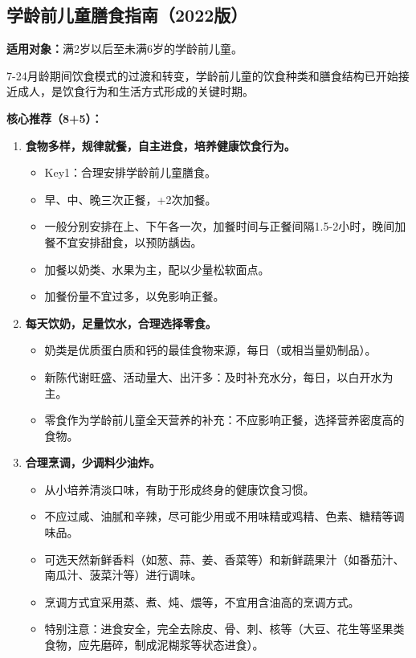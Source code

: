 \subsection{学龄前儿童膳食指南（2022版）}

\begin{keybox}
\textbf{适用对象：}满2岁以后至未满6岁的学龄前儿童。

7-24月龄期间饮食模式的过渡和转变，学龄前儿童的饮食种类和膳食结构已开始接近成人，是饮食行为和生活方式形成的关键时期。

\textbf{核心推荐（8+5）：}
\begin{enumerate}[leftmargin=*]
    \item \textbf{食物多样，规律就餐，自主进食，培养健康饮食行为。}
    \begin{itemize}[leftmargin=*]
        \item Key1：合理安排学龄前儿童膳食。
        \item 早、中、晚三次正餐，+2次加餐。
        \item 一般分别安排在上、下午各一次，加餐时间与正餐间隔1.5-2小时，晚间加餐不宜安排甜食，以预防龋齿。
        \item 加餐以奶类、水果为主，配以少量松软面点。
        \item 加餐份量不宜过多，以免影响正餐。
    \end{itemize}

    \item \textbf{每天饮奶，足量饮水，合理选择零食。}
    \begin{itemize}[leftmargin=*]
        \item 奶类是优质蛋白质和钙的最佳食物来源，每日（或相当量奶制品）。
        \item 新陈代谢旺盛、活动量大、出汗多：及时补充水分，每日，以白开水为主。
        \item 零食作为学龄前儿童全天营养的补充：不应影响正餐，选择营养密度高的食物。
    \end{itemize}

    \item \textbf{合理烹调，少调料少油炸。}
    \begin{itemize}[leftmargin=*]
        \item 从小培养清淡口味，有助于形成终身的健康饮食习惯。
        \item 不应过咸、油腻和辛辣，尽可能少用或不用味精或鸡精、色素、糖精等调味品。
        \item 可选天然新鲜香料（如葱、蒜、姜、香菜等）和新鲜蔬果汁（如番茄汁、南瓜汁、菠菜汁等）进行调味。
        \item 烹调方式宜采用蒸、煮、炖、煨等，不宜用含油高的烹调方式。
        \item 特别注意：进食安全，完全去除皮、骨、刺、核等（大豆、花生等坚果类食物，应先磨碎，制成泥糊浆等状态进食）。
    \end{itemize}


\end{enumerate}
\end{keybox}

